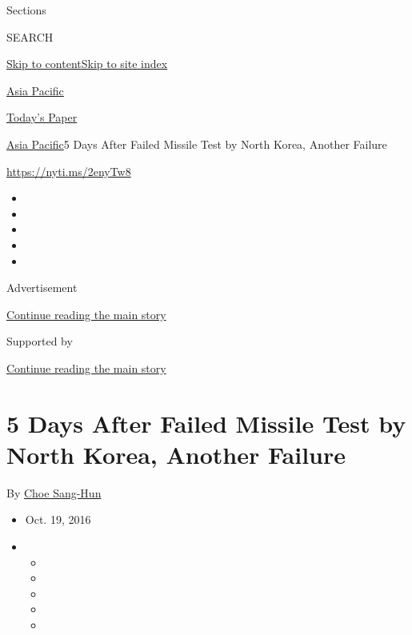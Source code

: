 Sections

SEARCH

\protect\hyperlink{site-content}{Skip to
content}\protect\hyperlink{site-index}{Skip to site index}

\href{https://www.nytimes3xbfgragh.onion/section/world/asia}{Asia
Pacific}

\href{https://myaccount.nytimes3xbfgragh.onion/auth/login?response_type=cookie\&client_id=vi}{}

\href{https://www.nytimes3xbfgragh.onion/section/todayspaper}{Today's
Paper}

\href{/section/world/asia}{Asia Pacific}\textbar{}5 Days After Failed
Missile Test by North Korea, Another Failure

\url{https://nyti.ms/2enyTw8}

\begin{itemize}
\item
\item
\item
\item
\item
\end{itemize}

Advertisement

\protect\hyperlink{after-top}{Continue reading the main story}

Supported by

\protect\hyperlink{after-sponsor}{Continue reading the main story}

\hypertarget{5-days-after-failed-missile-test-by-north-korea-another-failure}{%
\section{5 Days After Failed Missile Test by North Korea, Another
Failure}\label{5-days-after-failed-missile-test-by-north-korea-another-failure}}

By \href{http://www.nytimes3xbfgragh.onion/by/choe-sang-hun}{Choe
Sang-Hun}

\begin{itemize}
\item
  Oct. 19, 2016
\item
  \begin{itemize}
  \item
  \item
  \item
  \item
  \item
  \end{itemize}
\end{itemize}

